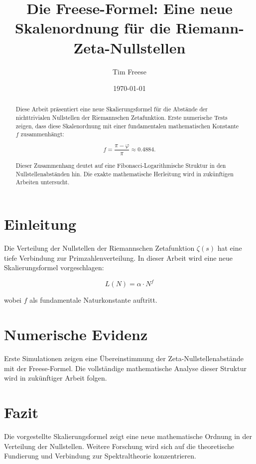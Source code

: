 \documentclass[a4paper,12pt]{article}
\title{Die Freese-Formel: Eine neue Skalenordnung für die Riemann-Zeta-Nullstellen}
\author{Tim Freese}
\date{\today}
\begin{document}
\maketitle

\begin{abstract}
Diese Arbeit präsentiert eine neue Skalierungsformel für die Abstände der nichttrivialen Nullstellen der Riemannschen Zetafunktion.  
Erste numerische Tests zeigen, dass diese Skalenordnung mit einer fundamentalen mathematischen Konstante \( f \) zusammenhängt:

\[
f = \frac{\pi - \varphi}{\pi} \approx 0.4884.
\]

Dieser Zusammenhang deutet auf eine Fibonacci-Logarithmische Struktur in den Nullstellenabständen hin.  
Die exakte mathematische Herleitung wird in zukünftigen Arbeiten untersucht.
\end{abstract}

\section{Einleitung}
Die Verteilung der Nullstellen der Riemannschen Zetafunktion \( \zeta(s) \) hat eine tiefe Verbindung zur Primzahlenverteilung.  
In dieser Arbeit wird eine neue Skalierungsformel vorgeschlagen:

\[
L(N) = \alpha \cdot N^f
\]

wobei \( f \) als fundamentale Naturkonstante auftritt.

\section{Numerische Evidenz}
Erste Simulationen zeigen eine Übereinstimmung der Zeta-Nullstellenabstände mit der Freese-Formel.  
Die vollständige mathematische Analyse dieser Struktur wird in zukünftiger Arbeit folgen.

\section{Fazit}
Die vorgestellte Skalierungsformel zeigt eine neue mathematische Ordnung in der Verteilung der Nullstellen.  
Weitere Forschung wird sich auf die theoretische Fundierung und Verbindung zur Spektraltheorie konzentrieren.
\end{document}
